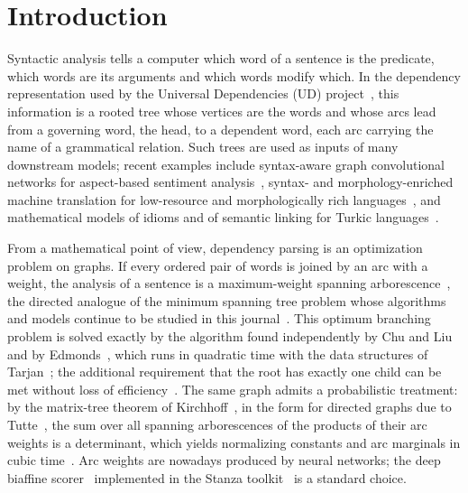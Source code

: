 \documentclass[mathematics,article,submit,pdftex,oneauthor]{Definitions/mdpi}
\begin{document}
\section{Introduction}

Syntactic analysis tells a computer which word of a sentence is the predicate, which words are its arguments and which words modify which.
In the dependency representation used by the Universal Dependencies (UD) project~\cite{deMarneffe2021}, this information is a rooted tree whose vertices are the words and whose arcs lead from a governing word, the head, to a dependent word, each arc carrying the name of a grammatical relation.
Such trees are used as inputs of many downstream models; recent examples include syntax-aware graph convolutional networks for aspect-based sentiment analysis~\cite{Chen2023DualGCN,Yang2022DepPOS}, syntax- and morphology-enriched machine translation for low-resource and morphologically rich languages~\cite{Qingdaoerji2022Mongolian,Donaj2022MSD}, and mathematical models of idioms and of semantic linking for Turkic languages~\cite{Nazirova2026,Akhmedjanova2026}.

From a mathematical point of view, dependency parsing is an optimization problem on graphs.
If every ordered pair of words is joined by an arc with a weight, the analysis of a sentence is a maximum-weight spanning arborescence~\cite{McDonald2005}, the directed analogue of the minimum spanning tree problem whose algorithms and models continue to be studied in this journal~\cite{Wang2023DMST,Abdelmaguid2018MST,Luo2024MST,Hosseini2024MST}.
This optimum branching problem is solved exactly by the algorithm found independently by Chu and Liu~\cite{ChuLiu1965} and by Edmonds~\cite{Edmonds1967}, which runs in quadratic time with the data structures of Tarjan~\cite{Tarjan1977}; the additional requirement that the root has exactly one child can be met without loss of efficiency~\cite{Zmigrod2020,Stanojevic2021}.
The same graph admits a probabilistic treatment: by the matrix-tree theorem of Kirchhoff~\cite{Kirchhoff1847}, in the form for directed graphs due to Tutte~\cite{Tutte1948}, the sum over all spanning arborescences of the products of their arc weights is a determinant, which yields normalizing constants and arc marginals in cubic time~\cite{Koo2007,SmithSmith2007,McDonaldSatta2007,Zmigrod2021}.
Arc weights are nowadays produced by neural networks; the deep biaffine scorer~\cite{Dozat2017} implemented in the Stanza toolkit~\cite{Qi2020} is a standard choice.
\end{document}
